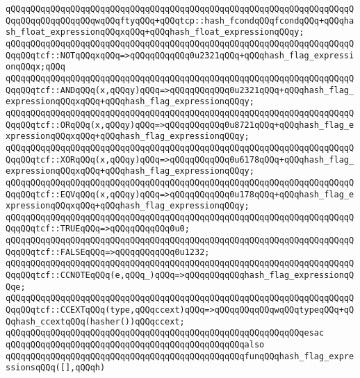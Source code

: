 \verb|qQQqqQQqqQQqqQQqqQQqqQQqqQQqqQQqqQQqqQQqqQQqqQQqqQQqqQQqqQQqqQQqqQQqqQQqqQQqqQQqqQQqqQQqwqQQqftyqQQq+qQQqtcp::hash_fcondqQQqfcondqQQq+qQQqhash_float_expressionqQQqxqQQq+qQQqhash_float_expressionqQQqy;|\newline
\newline
\verb|qQQqqQQqqQQqqQQqqQQqqQQqqQQqqQQqqQQqqQQqqQQqqQQqqQQqqQQqqQQqqQQqqQQqqQQqqQQqtcf::NOTqQQqxqQQq=>qQQqqQQqqQQq0u2321qQQq+qQQqhash_flag_expressionqQQqx;qQQq|\newline
\verb|qQQqqQQqqQQqqQQqqQQqqQQqqQQqqQQqqQQqqQQqqQQqqQQqqQQqqQQqqQQqqQQqqQQqqQQqqQQqtcf::ANDqQQq(x,qQQqy)qQQq=>qQQqqQQqqQQq0u2321qQQq+qQQqhash_flag_expressionqQQqxqQQq+qQQqhash_flag_expressionqQQqy;|\newline
\verb|qQQqqQQqqQQqqQQqqQQqqQQqqQQqqQQqqQQqqQQqqQQqqQQqqQQqqQQqqQQqqQQqqQQqqQQqqQQqtcf::ORqQQq(x,qQQqy)qQQq=>qQQqqQQqqQQq0u8721qQQq+qQQqhash_flag_expressionqQQqxqQQq+qQQqhash_flag_expressionqQQqy;|\newline
\verb|qQQqqQQqqQQqqQQqqQQqqQQqqQQqqQQqqQQqqQQqqQQqqQQqqQQqqQQqqQQqqQQqqQQqqQQqqQQqtcf::XORqQQq(x,qQQqy)qQQq=>qQQqqQQqqQQq0u6178qQQq+qQQqhash_flag_expressionqQQqxqQQq+qQQqhash_flag_expressionqQQqy;|\newline
\verb|qQQqqQQqqQQqqQQqqQQqqQQqqQQqqQQqqQQqqQQqqQQqqQQqqQQqqQQqqQQqqQQqqQQqqQQqqQQqtcf::EQVqQQq(x,qQQqy)qQQq=>qQQqqQQqqQQq0u178qQQq+qQQqhash_flag_expressionqQQqxqQQq+qQQqhash_flag_expressionqQQqy;|\newline
\verb|qQQqqQQqqQQqqQQqqQQqqQQqqQQqqQQqqQQqqQQqqQQqqQQqqQQqqQQqqQQqqQQqqQQqqQQqqQQqtcf::TRUEqQQq=>qQQqqQQqqQQq0u0;|\newline
\verb|qQQqqQQqqQQqqQQqqQQqqQQqqQQqqQQqqQQqqQQqqQQqqQQqqQQqqQQqqQQqqQQqqQQqqQQqqQQqtcf::FALSEqQQq=>qQQqqQQqqQQq0u1232;|\newline
\verb|qQQqqQQqqQQqqQQqqQQqqQQqqQQqqQQqqQQqqQQqqQQqqQQqqQQqqQQqqQQqqQQqqQQqqQQqqQQqtcf::CCNOTEqQQq(e,qQQq_)qQQq=>qQQqqQQqqQQqhash_flag_expressionqQQqe;|\newline
\verb|qQQqqQQqqQQqqQQqqQQqqQQqqQQqqQQqqQQqqQQqqQQqqQQqqQQqqQQqqQQqqQQqqQQqqQQqqQQqtcf::CCEXTqQQq(type,qQQqccext)qQQq=>qQQqqQQqqQQqwqQQqtypeqQQq+qQQqhash_ccextqQQq(hasher())qQQqccext;|\newline
\verb|qQQqqQQqqQQqqQQqqQQqqQQqqQQqqQQqqQQqqQQqqQQqqQQqqQQqqQQqqQQqesac|\newline
\newline
\verb|qQQqqQQqqQQqqQQqqQQqqQQqqQQqqQQqqQQqqQQqqQQqqQQqalso|\newline
\verb|qQQqqQQqqQQqqQQqqQQqqQQqqQQqqQQqqQQqqQQqqQQqqQQqfunqQQqhash_flag_expressionsqQQq([],qQQqh)|\newline

